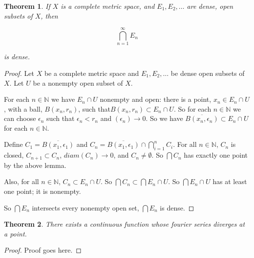 \documentclass{amsart}
\newcommand{\ep}{\epsilon}
\newcommand{\N}{\mathbb{N}}
\newtheorem{thm}{Theorem}[section]
\theoremstyle{definition}
\begin{document}
\begin{thm}If $X$ is a complete metric space, and $E_1, E_2, \ldots$ are dense, open subsets of $X$, then

\begin{displaymath}
\bigcap\limits_{n = 1}^{\infty} E_n
\end{displaymath}

is dense.
\end{thm}

\begin{proof}
Let $X$ be a complete metric space and $E_1, E_2, \ldots$ be dense open subsets of $X$. Let $U$ be a nonempty open subset of $X$.

For each $n \in \N$ we have $E_n \cap U$ nonempty and open: there is a point, $x_n \in E_n \cap U$, with a ball, $B(x_n, r_n)$, such that$B(x_n, r_n) \subset E_n \cap U$. 
So for each $n \in \N$ we can choose $\ep_n$ such that $\ep_n < r_n$ and $(\ep_n) \to 0$. %
So we have $\overline{B(x_n,\ep_n)} \subset E_n \cap U$ for each $n \in \N$.

Define $C_1 = \overline{B(x_1,\ep_1)}$ and $C_n = \overline{B(x_1,\ep_1)} \cap \bigcap\limits_{i=1}^n C_i$.
For all $n \in \N$,  $C_n$ is closed, $C_{n+1} \subset C_n$, $diam(C_n) \to 0$, and $C_n \neq \emptyset$.
So $\bigcap C_n$ has exactly one point by the above lemma. %

Also, for all $n \in \N$, $C_n \subset E_n \cap U$.
So $\bigcap C_n \subset \bigcap E_n \cap U$.
So $\bigcap E_n \cap U$ has at least one point; it is nonempty.

So $\bigcap E_n$ intersects every nonempty open set, $\bigcap E_n$ is dense.

\end{proof}

\begin{thm}
There exists a continuous function whose fourier series diverges at a point.
\end{thm}

\begin{proof}

Proof goes here.

\end{proof}
\end{document}
